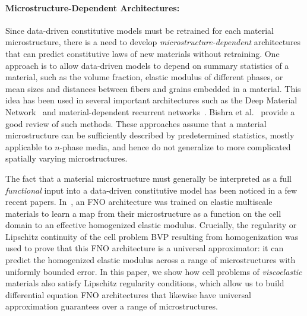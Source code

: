 \documentclass[letterpaper,11pt]{article}
\begin{document}
\paragraph{Microstructure-Dependent Architectures:}
Since data-driven constitutive models must be retrained for each material microstructure, there is a need to develop \textit{microstructure-dependent} architectures that can predict constitutive laws of new materials without retraining. One approach is to allow data-driven models to depend on summary statistics of a material, such as the volume fraction, elastic modulus of different phases, or mean sizes and distances between fibers and grains embedded in a material. This idea has been used in several important architectures such as the Deep Material Network~\cite{liu2019deep} and material-dependent recurrent networks~\cite{mozaffar2019deep}. Bishra et al.~\cite{bishara2023state} provide a good review of such methods. These approaches assume that a material microstructure can be sufficiently described by predetermined statistics, mostly applicable to $n$-phase media, and hence do not generalize to more complicated spatially varying microstructures.

The fact that a material microstructure must generally be interpreted as a full \textit{functional} input into a data-driven constitutive model has been noticed in a few recent papers. In~\cite{bhattacharya2024learning}, an FNO architecture was trained on elastic multiscale materials to learn a map from their microstructure as a function on the cell domain to an effective homogenized elastic modulus. Crucially, the regularity or Lipschitz continuity of the cell problem BVP resulting from homogenization was used to prove that this FNO architecture is a universal approximator: it can predict the homogenized elastic modulus across a range of microstructures with uniformly bounded error. In this paper, we show how cell problems of \textit{viscoelastic} materials also satisfy Lipschitz regularity conditions, which allow us to build differential equation FNO architectures that likewise have universal approximation guarantees over a range of microstructures.
\end{document}
